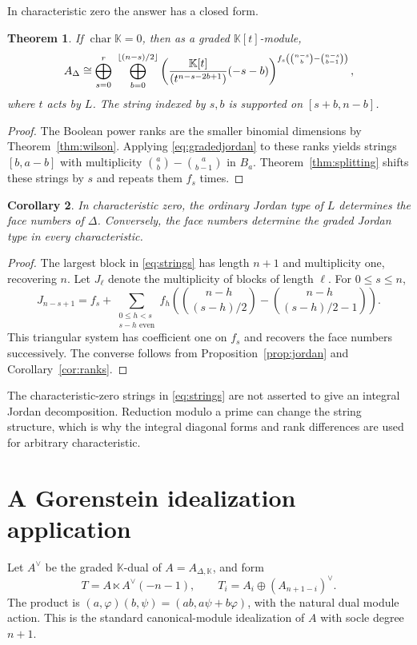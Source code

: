 \documentclass[11pt]{article}
\newtheorem{theorem}{Theorem}[section]
\newtheorem{corollary}[theorem]{Corollary}
\theoremstyle{remark}
\newcommand{\kk}{\mathbb K}
\begin{document}
In characteristic zero the answer has a closed form.
\begin{theorem}\label{thm:charzerojordan}
If $\operatorname{char}\kk=0$, then as a graded $\kk[t]$-module,
\begin{equation}\label{eq:strings}
 A_\Delta\cong
 \bigoplus_{s=0}^r\ \bigoplus_{b=0}^{\lfloor(n-s)/2\rfloor}
 \left(\frac{\kk[t]}{(t^{n-s-2b+1})}(-s-b)\right)^%
 {f_s\left(\binom{n-s}{b}-\binom{n-s}{b-1}\right)},
\end{equation}
where $t$ acts by $L$. The string indexed by $s,b$ is supported on $[s+b,n-b]$.
\end{theorem}
\begin{proof}
The Boolean power ranks are the smaller binomial dimensions by Theorem~\ref{thm:wilson}. Applying \eqref{eq:gradedjordan} to these ranks yields strings $[b,a-b]$ with multiplicity $\binom ab-\binom a{b-1}$ in $B_a$. Theorem~\ref{thm:splitting} shifts these strings by $s$ and repeats them $f_s$ times.
\end{proof}

\begin{corollary}\label{cor:recover}
In characteristic zero, the ordinary Jordan type of $L$ determines the face numbers of $\Delta$. Conversely, the face numbers determine the graded Jordan type in every characteristic.
\end{corollary}
\begin{proof}
The largest block in \eqref{eq:strings} has length $n+1$ and multiplicity one, recovering $n$. Let $J_\ell$ denote the multiplicity of blocks of length $\ell$. For $0\leq s\leq n$,
\[
 J_{n-s+1}=f_s+
 \sum_{\substack{0\leq h<s\\s-h\text{ even}}}
 f_h\left(\binom{n-h}{(s-h)/2}-\binom{n-h}{(s-h)/2-1}\right).
\]
This triangular system has coefficient one on $f_s$ and recovers the face numbers successively. The converse follows from Proposition~\ref{prop:jordan} and Corollary~\ref{cor:ranks}.
\end{proof}

The characteristic-zero strings in \eqref{eq:strings} are not asserted to give an integral Jordan decomposition. Reduction modulo a prime can change the string structure, which is why the integral diagonal forms and rank differences are used for arbitrary characteristic.

\section{A Gorenstein idealization application}\label{sec:idealization}
Let $A^\vee$ be the graded $\kk$-dual of $A=A_{\Delta,\kk}$, and form
\[
 T=A\ltimes A^\vee(-n-1),\qquad
 T_i=A_i\oplus(A_{n+1-i})^\vee.
\]
The product is $(a,\varphi)(b,\psi)=(ab,a\psi+b\varphi)$, with the natural dual module action. This is the standard canonical-module idealization of $A$ with socle degree $n+1$.
\end{document}
